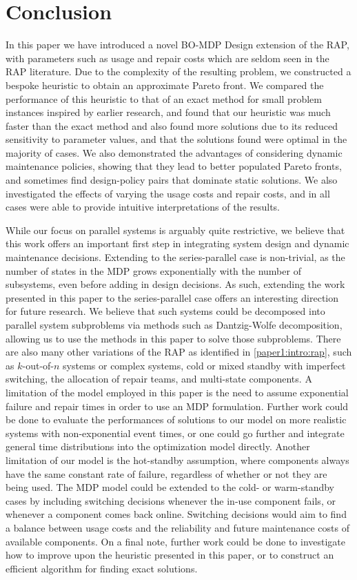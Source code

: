 \documentclass[11pt,authoryear,a4paper]{article}
\theoremstyle{definition}
\begin{document}
\section{Conclusion}\label{paper1:conclusion}
In this paper we have introduced a novel BO-MDP Design extension of the RAP, with parameters such as usage and repair costs which are seldom seen in the RAP literature. Due to the complexity of the resulting problem, we constructed a bespoke heuristic to obtain an approximate Pareto front. We compared the performance of this heuristic to that of an exact method for small problem instances inspired by earlier research, and found that our heuristic was much faster than the exact method and also found more solutions due to its reduced sensitivity to parameter values, and that the solutions found were optimal in the majority of cases. We also demonstrated the advantages of considering dynamic maintenance policies, showing that they lead to better populated Pareto fronts, and sometimes find design-policy pairs that dominate static solutions. We also investigated the effects of varying the usage costs and repair costs, and in all cases were able to provide intuitive interpretations of the results.

{While our focus on parallel systems is arguably quite restrictive, we believe that this work offers an important first step in integrating system design and dynamic maintenance decisions. Extending to the series-parallel case is non-trivial, as the number of states in the MDP grows exponentially with the number of subsystems, even before adding in design decisions. As such, extending the work presented in this paper to the series-parallel case offers an interesting direction for future research. We believe that such systems could be decomposed into parallel system subproblems via methods such as Dantzig-Wolfe decomposition, allowing us to use the methods in this paper to solve those subproblems.} There are also many other variations of the RAP as identified in \autoref{paper1:intro:rap}, such as $k$-out-of-$n$ systems or complex systems, cold or mixed standby with imperfect switching, the allocation of repair teams, and multi-state components. A limitation of the model employed in this paper is the need to assume exponential failure and repair times in order to use an MDP formulation. Further work could be done to evaluate the performances of solutions to our model on more realistic systems with non-exponential event times, or one could go further and integrate general time distributions into the optimization model directly. {Another limitation of our model is the hot-standby assumption, where components always have the same constant rate of failure, regardless of whether or not they are being used. The MDP model could be extended to the cold- or warm-standby cases by including switching decisions whenever the in-use component fails, or whenever a component comes back online. Switching decisions would aim to find a balance between usage costs and the reliability and future maintenance costs of available components.} On a final note, further work could be done to investigate how to improve upon the heuristic presented in this paper, or to construct an efficient algorithm for finding exact solutions.
\end{document}
